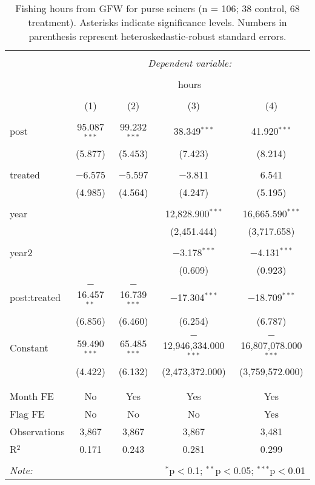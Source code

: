 \documentclass[12pt,]{article}
\begin{document}
\begin{table}[!htbp] \centering 
  \caption{\label{tab:purse}Fishing hours from GFW for purse seiners (n = 106; 38 control, 68 treatment). Asterisks indicate significance levels. Numbers in parenthesis represent heteroskedastic-robust standard errors.} 
  \label{} 
\begin{tabular}{@{\extracolsep{5pt}}lcccc} 
\\[-1.8ex]\hline 
\hline \\[-1.8ex] 
 & \multicolumn{4}{c}{\textit{Dependent variable:}} \\ 
\cline{2-5} 
\\[-1.8ex] & \multicolumn{4}{c}{hours} \\ 
\\[-1.8ex] & (1) & (2) & (3) & (4)\\ 
\hline \\[-1.8ex] 
 post & 95.087$^{***}$ & 99.232$^{***}$ & 38.349$^{***}$ & 41.920$^{***}$ \\ 
  & (5.877) & (5.453) & (7.423) & (8.214) \\ 
  & & & & \\ 
 treated & $-$6.575 & $-$5.597 & $-$3.811 & 6.541 \\ 
  & (4.985) & (4.564) & (4.247) & (5.195) \\ 
  & & & & \\ 
 year &  &  & 12,828.900$^{***}$ & 16,665.590$^{***}$ \\ 
  &  &  & (2,451.444) & (3,717.658) \\ 
  & & & & \\ 
 year2 &  &  & $-$3.178$^{***}$ & $-$4.131$^{***}$ \\ 
  &  &  & (0.609) & (0.923) \\ 
  & & & & \\ 
 post:treated & $-$16.457$^{**}$ & $-$16.739$^{***}$ & $-$17.304$^{***}$ & $-$18.709$^{***}$ \\ 
  & (6.856) & (6.460) & (6.254) & (6.787) \\ 
  & & & & \\ 
 Constant & 59.490$^{***}$ & 65.485$^{***}$ & $-$12,946,334.000$^{***}$ & $-$16,807,078.000$^{***}$ \\ 
  & (4.422) & (6.132) & (2,473,372.000) & (3,759,572.000) \\ 
  & & & & \\ 
\hline \\[-1.8ex] 
Month FE & No & Yes & Yes & Yes \\ 
Flag FE & No & No & No & Yes \\ 
Observations & 3,867 & 3,867 & 3,867 & 3,481 \\ 
R$^{2}$ & 0.171 & 0.243 & 0.281 & 0.299 \\ 
\hline 
\hline \\[-1.8ex] 
\textit{Note:}  & \multicolumn{4}{r}{$^{*}$p$<$0.1; $^{**}$p$<$0.05; $^{***}$p$<$0.01} \\ 
\end{tabular} 
\end{table}
\end{document}
